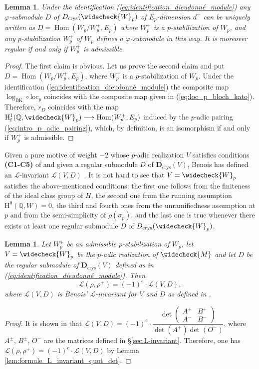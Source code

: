 \documentclass[12pt]{amsart}
\newcommand\bQ{\mathbb{Q}}
\newcommand\cL{\mathcal{L}}
\newcommand{\loc}{\mathrm{loc}}
\DeclareMathOperator{\Hom}{Hom}
\newcommand{\HH}{\mathrm{H}}
\newcommand{\ff}{\mathrm{f}}
\newcommand{\crys}{\mathrm{crys}}
\newcommand{\BK}{\mathrm{BK}}
\theoremstyle{defstyle}
\theoremstyle{thmstyle}
\newtheorem{lemme}[subsubsection]{Lemma}
\begin{document}
\begin{lemme}\label{lem:equivalence_admissible_régulier}
	Under the identification (\ref{eq:identification_dieudonné_module}) any $\varphi$-submodule $D$ of $\textbf{D}_\crys(\widecheck{W}_p)$ of $E_p$-dimension $d^-$ can be uniquely written as $D=\Hom\left(W_p/W^+_p,E_p\right)$ where $W_p^+$ is a $p$-stabilization of $W_p$, and any $p$-stabilization $W_p^+$ of $W_p$ defines a $\varphi$-submodule in this way. It is moreover regular if and only if $W_p^+$ is admissible. 
\end{lemme}
\begin{proof}
	The first claim is obvious. Let us prove the second claim and put $D=\Hom(W_p/W_p^+,E_p)$, where $W_p^+$ is a $p$-stabilization of $W_p$. Under the identification (\ref{eq:identification_dieudonné_module}) the composite map $\log_\BK \circ \loc_p$ coincides with the composite map given in (\ref{eq:loc_p_bloch_kato}). Therefore, $r_D$ coincides with the map $\HH^1_\ff(\bQ,\widecheck{W}_p) \longrightarrow \Hom(W_p^+,E_p)$ induced by the $p$-adic pairing (\ref{eq:intro_p_adic_pairing}), which, by definition, is an isomorphism if and only if $W_p^+$ is admissible.
\end{proof}
Given a pure motive of weight $-2$ whose $p$-adic realization $V$ satisfies conditions \textbf{(C1-C5)} of \cite[§4.1.2]{benoiscrys} and given a regular submodule $D$ of $\textbf{D}_\crys(V)$, Benois has defined an $\cL$-invariant $\cL(V,D)$ \cite[§4.1.4]{benoiscrys}. It is not hard to see that $V=\widecheck{W}_p$ satisfies the above-mentioned conditions: the first one follows from the finiteness of the ideal class group of $H$, the second one from the running assumption $\HH^0(\bQ,W)=0$, the third and fourth ones from the unramifiedness assumption at $p$ and from the semi-simplicity of $\rho(\sigma_p)$, and the last one is true whenever there exists at least one regular submodule $D$ of $\textbf{D}_\crys(\widecheck{W}_p)$.
\begin{lemme}\label{lem:comparaison_L_invariant_Benois}
		Let $W_p^+$ be an admissible $p$-stabilization of $W_p$, let $V=\widecheck{W}_p$ be the $p$-adic realization of $\widecheck{M}$ and let $D$ be the regular submodule of $\textbf{D}_\crys(V)$ defined as in (\ref{eq:identification_dieudonné_module}). Then 
		$$\cL(\rho,\rho^+)=(-1)^e \cdot  \cL(V,D),$$ 
		where $\cL(V,D)$ is Benois' $\cL$-invariant for $V$ and $D$ as defined in \cite[§4.1.4]{benoiscrys}. 
\end{lemme}
\begin{proof}
It is shown in \cite[Thm. 2.15]{maksouddimitrov} that $\cL(V,D)=(-1)^e \cdot \dfrac{\det \begin{pmatrix}A^+ & B^+ \\ A^- & B^- \end{pmatrix} }{\det(A^+)\det(O^-)}$, where $A^\pm$, $B^\pm$, $O^-$ are the matrices defined in \S\ref{sec:L-invariant}. Therefore, one has $\cL(\rho,\rho^+)=(-1)^e \cdot  \cL(V,D)$ by Lemma \ref{lem:formule_L_invariant_quot_det}.
\end{proof}
\end{document}
